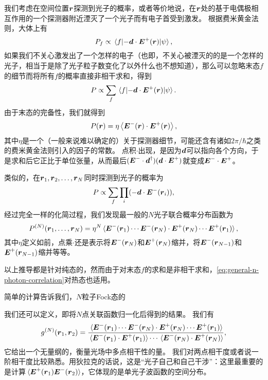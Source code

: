 我们考虑在空间位置$\vb*{r}$探测到光子的概率，或者等价地说，在$\vb*{r}$处的基于电偶极相互作用的一个探测器附近湮灭了一个光子而有电子首受到激发。
根据费米黄金法则，大体上有
\[
    P_f \propto \mel{f}{- \vb*{d} \cdot \vb*{E}^+(\vb*{r})}{\psi},
\]
如果我们不关心激发出了一个怎样的电子（也即，不关心被湮灭的的是一个怎样的光子，相当于是除了光子粒子数变化了以外什么也不想知道），那么可以忽略末态$f$的细节而将所有$f$的概率直接非相干求和，得到
\[
    P \propto \sum_f \mel{f}{- \vb*{d} \cdot \vb*{E}^+(\vb*{r})}{\psi}.
\]
由于末态的完备性，我们就得到
\begin{equation}
    P(\vb*{r}) = \eta \expval{\vb*{E}^-(\vb*{r}) \cdot \vb*{E}^+(\vb*{r})},
\end{equation}
其中$\eta$是一个（一般来说难以确定的）关于探测器细节，可能还含有诸如$2\pi / \hbar$之类的费米黄金法则引入的因子的常数。
点积$\cdot$出现，是因为$\vb*{d}$可以指向各个方向，于是求和后它正比于单位张量，从而最后$(\vb*{E}^- \cdot \vb*{d}^\dagger) (\vb*{d} \cdot \vb*{E}^+)$就变成$\vb*{E}^- \cdot \vb*{E}^+$。

类似的，在$\vb*{r}_1, \vb*{r}_2, \ldots, \vb*{r}_N$同时探测到光子的概率为
\[
    P \propto \sum_{f} \prod_i (- \vb*{d} \cdot \vb*{E}^-(\vb*{r}_i)),
\]
经过完全一样的化简过程，我们发现最一般的$N$光子联合概率分布函数为
\begin{equation}
    P^{(N)}(\vb*{r}_1, \ldots, \vb*{r}_N) = \eta^N \expval*{\vb*{E}^-(\vb*{r}_1) \cdots \vb*{E}^-(\vb*{r}_N) \cdot \vb*{E}^+(\vb*{r}_N) \cdots \vb*{E}^+(\vb*{r}_1)},
    \label{eq:general-n-photon-correlation}
\end{equation}
其中$\eta$定义如前，点乘$\cdot$还是表示将$\vb*{E}^-(\vb*{r}_N)$和$\vb*{E}^+(\vb*{r}_N)$缩并，将$\vb*{E}^-(\vb*{r}_{N-1})$和$\vb*{E}^+(\vb*{r}_{N-1})$缩并等等。

以上推导都是针对纯态的，然而由于对末态$f$的求和是非相干求和，\eqref{eq:general-n-photon-correlation}对热态也适用。

简单的计算告诉我们，$N$粒子Fock态的

我们还可以定义，即将$N$点关联函数归一化后得到的结果。
我们有
\begin{equation}
    g^{(N)}(\vb*{r}_1, \vb*{r}_2) = \frac{\expval*{\vb*{E}^-(\vb*{r}_1) \cdots \vb*{E}^-(\vb*{r}_N) \cdot \vb*{E}^+(\vb*{r}_N) \cdots \vb*{E}^+(\vb*{r}_1)}}{\expval*{\vb*{E}^-(\vb*{r}_1) \cdot \vb*{E}^+(\vb*{r}_1)} \cdots \expval*{\vb*{E}^-(\vb*{r}_N) \cdot \vb*{E}^+(\vb*{r}_N)}},
\end{equation}
它给出一个无量纲的，衡量光场中多点相干性的量。
我们对两点相干度或者说一阶相干度比较熟悉。用狄拉克的话说，这是“光子自己和自己干涉”：这里最重要的是计算$\expval*{\vb*{E}^+(\vb*{r}_1) \vb*{E}^-(\vb*{r}_2)}$，它体现的是单光子波函数的空间分布。

